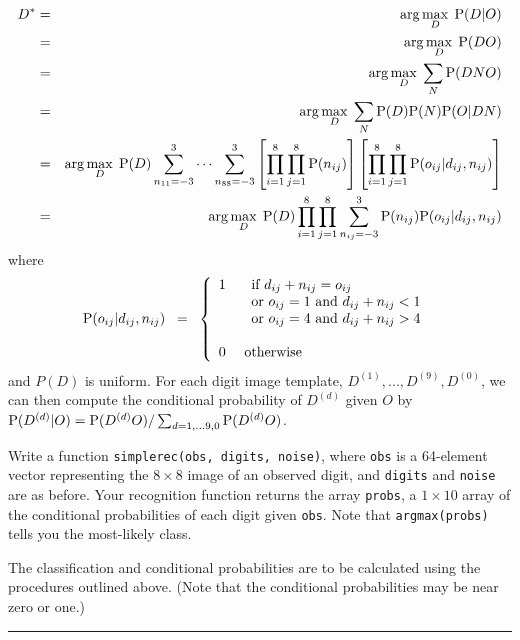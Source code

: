 \documentclass[12pt]{article}
\begin{document}
\begin{eqnarray*}
D^* & = & \arg\max_D \; {\rm P}(D|O)
\\
& = & \arg\max_D \; {\rm P}(DO)
\\
& = & \arg\max_D \; \sum_N {\rm P}(DNO)
\\
& = & \arg\max_D \; \sum_N {\rm P}(D) {\rm P}(N) {\rm P}(O|DN)
\\
& = & \arg\max_D \; {\rm P}(D) \sum_{n_{11}=-3}^3\cdots\sum_{n_{88}=-3}^3 \left[\prod_{i=1}^8\prod_{j=1}^8{\rm P}(n_{ij})\right]\left[\prod_{i=1}^8\prod_{j=1}^8{\rm P}(o_{ij}|d_{ij},n_{ij})\right]
\\
& = & \arg\max_D \; {\rm P}(D) \prod_{i=1}^8\prod_{j=1}^8 \sum_{n_{ij}=-3}^3 {\rm P}(n_{ij}){\rm P}(o_{ij}|d_{ij},n_{ij})
\end{eqnarray*}
where
\[
\PP(o_{ij}|d_{ij},n_{ij}) \;\;=\;\;\left\{
\begin{array}{ll}
1 & \begin{array}[t]{l}\mbox{ if } d_{ij}+n_{ij}=o_{ij}\\
                    \mbox{ or } o_{ij} = 1 \mbox{ and } d_{ij}+n_{ij}<1\\
                    \mbox{ or } o_{ij} = 4 \mbox{ and } d_{ij}+n_{ij}>4\\
\rule{0em}{1ex}
    \end{array}
\\
0 & \mbox{ otherwise }
\end{array}
\right.
\]
and $P(D)$ is uniform.
For each digit image template, $D^{(1)},...,D^{(9)},D^{(0)}$,
we can then compute the conditional probability of $D^{(d)}$ given
$O$ by ${\rm P}(D^{(d)}|O)={\rm P}(D^{(d)}O)/\sum_{d=1,...9,0}{\rm P}(D^{(d)}O)$.

\bigskip

Write a function {\tt simplerec(obs, digits, noise)}, where {\tt obs} is
a 64-element vector representing the $8\times8$ image of an observed digit, 
and {\tt digits} and {\tt noise} are as before. Your recognition function 
returns the array {\tt probs}, a $1\times10$ array of the conditional
probabilities of each digit given {\tt obs}. Note that {\tt argmax(probs)} tells you the most-likely class.

The classification and conditional probabilities are to be calculated
using the procedures outlined above.
(Note that the conditional probabilities may be near zero or one.)


\vspace*{1\baselineskip}

\hrule
\end{document}
